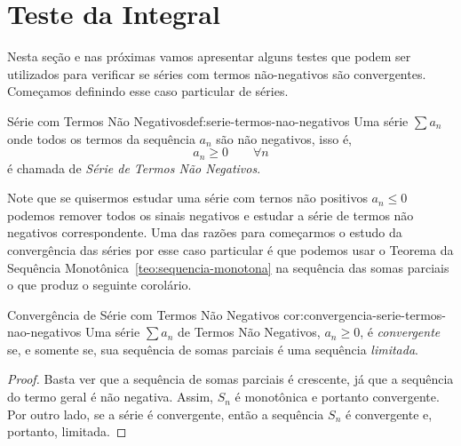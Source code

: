 \section{Teste da Integral}

Nesta seção e nas próximas vamos apresentar alguns testes que podem ser utilizados
para verificar se séries com termos não-negativos são convergentes. Começamos
definindo esse caso particular de séries.

\begin{definicao}{Série com Termos Não Negativos}{def:serie-termos-nao-negativos}
  Uma série $\sum a_n$ onde todos os termos da sequência $a_n$ são não negativos,
  isso é,
  \[
    a_n \geq 0 \qquad \forall n
  \]
  é chamada de \emph{Série de Termos Não Negativos}.
\end{definicao}

Note que se quisermos estudar uma série com ternos não positivos \(a_n\leq 0\)
podemos remover todos os sinais negativos e estudar a série de termos
não negativos correspondente. Uma das razões para começarmos o estudo
da convergência das séries por esse caso particular é que podemos usar
o Teorema da Sequência Monotônica~\ref{teo:sequencia-monotona} na
sequência das somas parciais o que produz o seguinte corolário.

\begin{corolario}{Convergência de Série com Termos Não Negativos}
                 {cor:convergencia-serie-termos-nao-negativos}
    Uma série $\sum a_n$ de Termos Não Negativos, $a_n \geq 0$,
    é \emph{convergente} se, e somente se, sua sequência de somas
    parciais é uma sequência \emph{limitada}.
\end{corolario}
\begin{proof}
  Basta ver que a sequência de somas parciais é crescente,
  já que a sequência do termo geral é não negativa.
  Assim, $S_n$ é monotônica e portanto convergente.
  Por outro lado, se a série é convergente,
  então a sequência $S_n$ é convergente e, portanto, limitada.
\end{proof}

